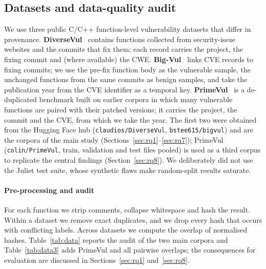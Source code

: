 \subsection{Datasets and data-quality audit}
We use three public C/C++ function-level vulnerability datasets that differ in provenance.
\textbf{DiverseVul}~\cite{chen2023diversevul} contains functions collected from security-issue websites and the commits that fix them; each record carries the project, the fixing commit and (where available) the CWE.
\textbf{Big-Vul}~\cite{fan2020bigvul} links CVE records to fixing commits; we use the pre-fix function body as the vulnerable sample, the unchanged functions from the same commits as benign samples, and take the publication year from the CVE identifier as a temporal key.
\textbf{PrimeVul}~\cite{ding2024primevul} is a de-duplicated benchmark built on earlier corpora in which many vulnerable functions are paired with their patched versions; it carries the project, the commit and the CVE, from which we take the year. The first two were obtained from the Hugging Face hub (\texttt{claudios/DiverseVul}, \texttt{bstee615/bigvul}) and are the corpora of the main study (Sections~\ref{sec:rq1}--\ref{sec:rq7}); PrimeVul (\texttt{colin/PrimeVul}, train, validation and test files pooled) is used as a third corpus to replicate the central findings (Section~\ref{sec:rq8}).
We deliberately did not use the Juliet test suite, whose synthetic flaws make random-split results saturate.

\paragraph{Pre-processing and audit}
For each function we strip comments, collapse whitespace and hash the result. Within a dataset we remove exact duplicates, and we drop every hash that occurs with conflicting labels. Across datasets we compute the overlap of normalised hashes.
Table~\ref{tab:data} reports the audit of the two main corpora and Table~\ref{tab:data3} adds PrimeVul and all pairwise overlaps; the consequences for evaluation are discussed in Sections~\ref{sec:rq1} and~\ref{sec:rq8}.



